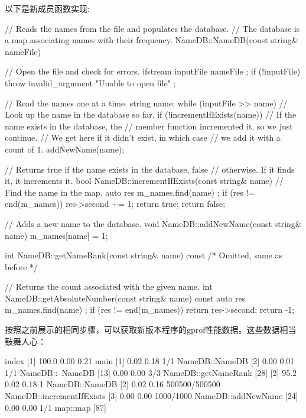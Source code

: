 以下是新成员函数实现:

\begin{cpp}
// Reads the names from the file and populates the database.
// The database is a map associating names with their frequency.
NameDB::NameDB(const string& nameFile)
{
    // Open the file and check for errors.
    ifstream inputFile { nameFile };
    if (!inputFile) {
        throw invalid_argument { "Unable to open file" };
    }

    // Read the names one at a time.
    string name;
    while (inputFile >> name) {
        // Look up the name in the database so far.
        if (!incrementIfExists(name)) {
            // If the name exists in the database, the
            // member function incremented it, so we just continue.
            // We get here if it didn't exist, in which case
            // we add it with a count of 1.
            addNewName(name);
        }
    }
}

// Returns true if the name exists in the database, false
// otherwise. If it finds it, it increments it.
bool NameDB::incrementIfExists(const string& name)
{
    // Find the name in the map.
    auto res { m_names.find(name) };
    if (res != end(m_names)) {
        res->second += 1;
        return true;
    }
    return false;
}

// Adds a new name to the database.
void NameDB::addNewName(const string& name)
{
    m_names[name] = 1;
}

int NameDB::getNameRank(const string& name) const { /* Omitted, same as before */ }

// Returns the count associated with the given name.
int NameDB::getAbsoluteNumber(const string& name) const
{
    auto res { m_names.find(name) };
    if (res != end(m_names)) {
        return res->second;
    }
    return -1;
}
\end{cpp}


按照之前展示的相同步骤，可以获取新版本程序的gprof性能数据。这些数据相当鼓舞人心：


\begin{shell}
index   %
[1]     100.0   0.00     0.21                 main [1]
                0.02     0.18      1/1        NameDB::NameDB [2]
                0.00     0.01      1/1        NameDB::~NameDB [13]
                0.00     0.00      3/3        NameDB::getNameRank [28]
[2]      95.2   0.02     0.18      1          NameDB::NameDB [2]
                0.02     0.16 500500/500500   NameDB::incrementIfExists
[3]             0.00     0.00   1000/1000     NameDB::addNewName [24]
                0.00     0.00      1/1        map::map [87]
\end{shell}

